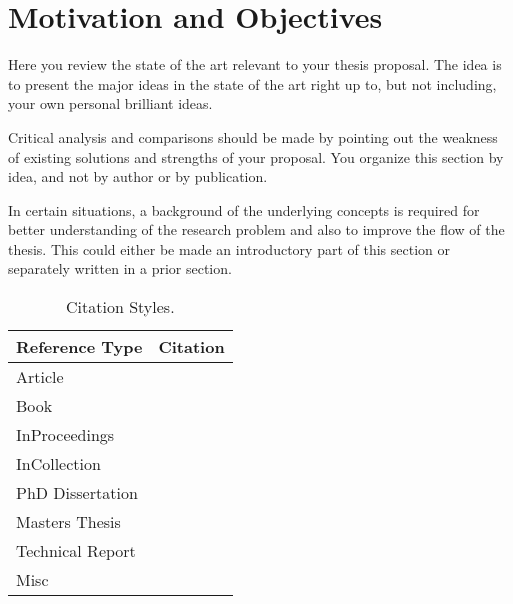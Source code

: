 \chapter{Motivation and Objectives}\label{c-review}
Here you review the state of the art relevant to your thesis proposal. The idea is to present the major ideas in the state of the art right up to, but not including, your own personal brilliant ideas.

Critical analysis and comparisons should be made by pointing out the weakness of existing solutions and strengths of your proposal. You organize this section by idea, and not by author or by publication.

In certain situations, a background of the underlying concepts is required for better understanding of the research problem and also to improve the flow of the thesis. This could either be made an introductory part of this section or separately written in a prior section.

\begin{table}[!th]
\centering
\begin{tabular}{|p{3cm}|p{9cm}|}
\hline
\textbf{Reference Type} & \textbf{Citation}\\ \hline
Article & \cite{iqbal2018generic}\\ \hline
Book & \cite[p.127-133]{tayyaba20205g}\\ \hline
InProceedings & \cite{khattak2019perception}\\ \hline
InCollection & \cite{khattak2019perception}\\ \hline
PhD Dissertation & \cite{khattak2019perception}\\ \hline
Masters Thesis & \cite{khattak2019toward}\\ \hline
Technical Report & \cite{khattak2019perception}\\ \hline
Misc & \cite{khattak2014coap}\\ \hline
\end{tabular}
\caption{Citation Styles.}
\label{t-References}
\end{table}